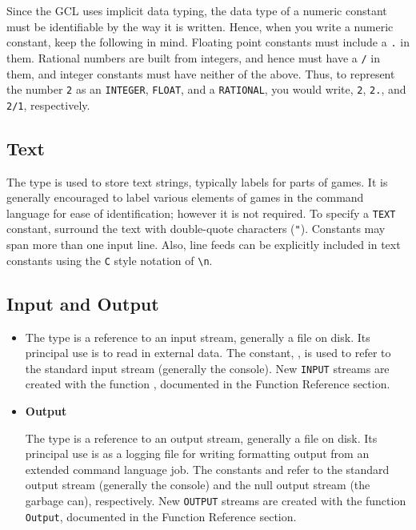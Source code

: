 Since the GCL uses implicit data typing, the data type of a numeric
constant must be identifiable by the way it is written.  Hence, when
you write a numeric constant, keep the following in mind.  Floating
point constants must include a \verb+.+ in them.  Rational numbers are
built from integers, and hence must have a \verb+/+ in them, and
integer constants must have neither of the above. Thus, to represent
the number \verb+2+ as an \verb+INTEGER+, \verb+FLOAT+, and a
\verb+RATIONAL+, you would write, \verb+2+, \verb+2.+, and \verb+2/1+,
respectively.

\subsection{Text}

The  type is used to store text strings, typically labels
for parts of games.  It is generally encouraged to label various
elements of games in the command language for ease of identification;
however it is not required.  To specify a {\tt TEXT} constant,
surround the text with double-quote characters ({\tt "}).  Constants
may span more than one input line.  Also, line feeds can be explicitly
included in text constants using the \verb+C+ style notation of
\verb+\n+. 

\subsection{Input and Output}

\begin{itemize}
\item{}

The  type is a reference to an input stream, generally a
file on disk.  Its principal use is to read in external data.  The
constant, , is used to refer to the standard input stream
(generally the console).  New \verb+INPUT+ streams are created with
the function , documented in the Function Reference
section.

\item {\bf Output}

The  type is a reference to an output stream, generally a
file on disk.  Its principal use is as a logging file for writing
formatting output from an extended command language job.  The
constants  and  refer to the standard
output stream (generally the console) and the null output stream (the
garbage can), respectively.  New \verb+OUTPUT+ streams are created with the 
function \verb+Output+, documented in the Function Reference section.
\end{itemize}

